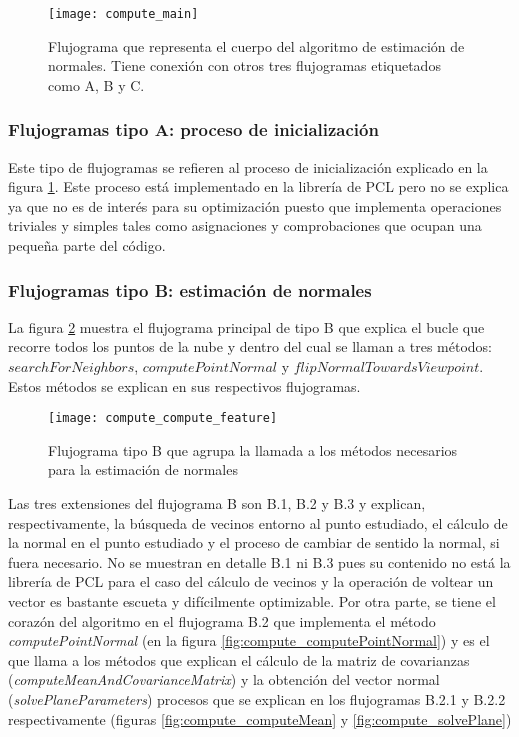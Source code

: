 \begin{figure}[h!]
\centering
\texttt{[image: compute\_main]}
\caption{Flujograma que representa el cuerpo del algoritmo de estimación de normales. Tiene conexión con otros tres flujogramas etiquetados como A, B y C.}\label{fig:compute_main}
\end{figure}

\subsubsection{Flujogramas tipo A: proceso de inicialización}
Este tipo de flujogramas se refieren al proceso de inicialización explicado en la figura \ref{fig:compute_main}. Este proceso está implementado en la librería de PCL pero no se explica ya que no es de interés para su optimización puesto que implementa operaciones triviales y simples tales como asignaciones y comprobaciones que ocupan una pequeña parte del código.




\subsubsection{Flujogramas tipo B: estimación de normales}

La figura \ref{fig:compute_compute_feature} muestra el flujograma principal de tipo B que explica el bucle que recorre todos los puntos de la nube y dentro del cual se llaman a tres métodos: $searchForNeighbors$, $computePointNormal$ y $flipNormalTowardsViewpoint$. Estos métodos se explican en sus respectivos flujogramas.

\begin{figure}[h!]
\centering
\texttt{[image: compute\_compute\_feature]}
\caption{Flujograma tipo B que agrupa la llamada a los métodos necesarios para la estimación de normales}\label{fig:compute_compute_feature}
\end{figure}

Las tres extensiones del flujograma B son B.1, B.2 y B.3 y explican, respectivamente, la búsqueda de vecinos entorno al punto estudiado, el cálculo de la normal en el punto estudiado y el proceso de cambiar de sentido la normal, si fuera necesario. No se muestran en detalle B.1 ni B.3 pues su contenido no está la librería de PCL para el caso del cálculo de vecinos y la operación de voltear un vector es bastante escueta y difícilmente optimizable. Por otra parte, se tiene el corazón del algoritmo en el flujograma B.2 que implementa el método \textit{computePointNormal} (en la figura \ref{fig:compute_computePointNormal}) y es el que llama a los métodos que explican el cálculo de la matriz de covarianzas (\textit{computeMeanAndCovarianceMatrix}) y la obtención del vector normal (\textit{solvePlaneParameters}) procesos que se explican en los flujogramas B.2.1 y B.2.2 respectivamente (figuras \ref{fig:compute_computeMean} y \ref{fig:compute_solvePlane})



